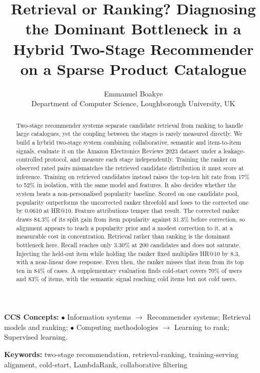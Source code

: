 \documentclass[10pt,twocolumn]{article}
\title{\vspace{-2em}\textbf{Retrieval or Ranking? Diagnosing the Dominant
Bottleneck in a Hybrid Two-Stage Recommender on a Sparse Product
Catalogue}\vspace{-0.5em}}
\author{Emmanuel Boakye\\
\small Department of Computer Science, Loughborough University, UK}
\date{}
\newenvironment{frontmatterblock}
  {\par\addvspace{0.6em}\small\setlength{\parskip}{0.4em}}
  {\par\addvspace{0.6em}}
\begin{document}
\maketitle
\thispagestyle{fancy}

\begin{abstract}
\small
Two-stage recommender systems separate candidate retrieval from ranking to
handle large catalogues, yet the coupling between the stages is rarely
measured directly. We build a hybrid two-stage system combining collaborative,
semantic and item-to-item signals, evaluate it on the Amazon Electronics
Reviews 2023 dataset under a leakage-controlled protocol, and measure each
stage independently. Training the ranker on observed rated pairs mismatches
the retrieved candidate distribution it must score at inference. Training on
retrieved candidates instead raises the top-ten hit rate from 17\% to 52\% in
isolation, with the same model and features. It also decides whether the
system beats a non-personalised popularity baseline. Scored on one candidate
pool, popularity outperforms the uncorrected ranker threefold and loses to the
corrected one by 0.0610 at HR@10. Feature attributions temper that result. The
corrected ranker draws 84.3\% of its split gain from item popularity against
31.3\% before correction, so alignment appears to teach a popularity prior and
a modest correction to it, at a measurable cost in concentration. Retrieval
rather than ranking is the dominant bottleneck here. Recall reaches only
3.30\% at 200 candidates and does not saturate. Injecting the held-out item
while holding the ranker fixed multiplies HR@10 by 8.3, with a near-linear
dose response. Even then, the ranker misses that item from its top ten in
84\% of cases. A supplementary evaluation finds cold-start covers 70\% of
users and 83\% of items, with the semantic signal reaching cold items but not
cold users.
\end{abstract}

\begin{frontmatterblock}
\noindent\textbf{CCS Concepts:}
$\bullet$ Information systems $\rightarrow$ Recommender systems;
Retrieval models and ranking;
$\bullet$ Computing methodologies $\rightarrow$ Learning to rank;
Supervised learning.

\noindent\textbf{Keywords:} two-stage recommendation, retrieval-ranking,
training-serving alignment, cold-start, LambdaRank, collaborative filtering
\end{frontmatterblock}
\end{document}
